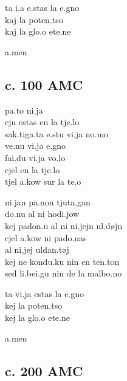 \begin{multicols*}{2}
    t\tiebar\esh a\alvrap{} \prstr\labrox i.a \prstr e.stas la \prstr \alvrap e.gno\\
    kaj la po\prstr ten.t\tiebar so\\
    kaj la \prstr glo.\alvrap o e\prstr te\alvrap.ne

    \prstr a.men

    \end{multicols*}

\subsection{c. 100 AMC}

\prstr pa.t\alvrap o \prstr ni.ja\\
\prstr cju e\prstr stas en la \prstr t\tiebar\esh je.lo\\
\scstr sa\engma k.ti\prstr ga.ta \prstr e.stu \prstr vi.ja \prstr no.mo\\
\prstr ve.nu \prstr vi.ja \prstr\alvrap e.gno\\
fa\prstr\alvrap i.d\tiebar\ezh u \prstr vi.ja \prstr vo.lo\\
cjel en la \prstr t\tiebar\esh je.lo\\
tjel \prstr a\engma.kow sur la \prstr te.\alvrap o

\prstr ni.jan \prstr pa.non \scstr t\tiebar\esh ju\prstr ta.gan\\
\prstr do.nu al ni ho\prstr di.jow\\
kej pa\alvrap\prstr don.u al ni \prstr ni.jejn \prstr\esh ul.døjn\\
cjel \prstr a\engma.kow ni pa\alvrap\prstr do.nas\\
al \prstr ni.jej \esh ul\prstr dan.tøj\\
kej ne kon\prstr du.ku nin en \prstr ten.ton\\
sed \scstr li.be\prstr\alvrap i.gu nin de la mal\prstr bo.no

t\tiebar\esh a\alvrap{} \prstr vi.ja e\prstr stas la \prstr \alvrap e.gno\\
kej la po\prstr ten.t\tiebar so\\
kej la \prstr glo.\alvrap o e\prstr te\alvrap.ne

\prstr a.men


\subsection{c. 200 AMC}

